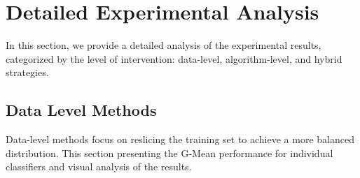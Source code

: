 \documentclass[sigconf]{acmart}
\begin{document}
\section{Detailed Experimental Analysis}
\label{sec:experimental_analysis}

In this section, we provide a detailed analysis of the experimental results, categorized by the level of intervention: data-level, algorithm-level, and hybrid strategies.

\subsection{Data Level Methods}
Data-level methods focus on reslicing the training set to achieve a more balanced distribution. This section presenting the G-Mean performance for individual classifiers and visual analysis of the results.
\end{document}
